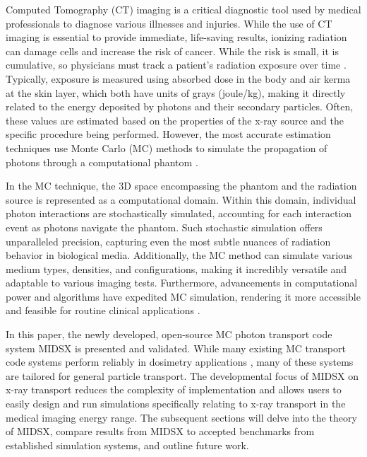 \par Computed Tomography (CT) imaging is a critical diagnostic tool used by medical professionals to diagnose various illnesses and injuries. While the use of CT imaging is essential to provide immediate, life-saving results, ionizing radiation can damage cells and increase the risk of cancer. While the risk is small, it is cumulative, so physicians must track a patient's radiation exposure over time \cite{lauer2009elements}. Typically, exposure is measured using absorbed dose in the body and air kerma at the skin layer, which both have units of grays (joule/kg), making it directly related to the energy deposited by photons and their secondary particles. Often, these values are estimated based on the properties of the x-ray source and the specific procedure being performed. However, the most accurate estimation techniques use Monte Carlo (MC) methods to simulate the propagation of photons through a computational phantom \cite{essmedphys2012}. 
\par In the MC technique, the 3D space encompassing the phantom and the radiation source is represented as a computational domain. Within this domain, individual photon interactions are stochastically simulated, accounting for each interaction event as photons navigate the phantom. Such stochastic simulation offers unparalleled precision, capturing even the most subtle nuances of radiation behavior in biological media. Additionally, the MC method can simulate various medium types, densities, and configurations, making it incredibly versatile and adaptable to various imaging tests. Furthermore, advancements in computational power and algorithms have expedited MC simulation, rendering it more accessible and feasible for routine clinical applications \cite{fernandez_bosman_validation_2021}.
\par In this paper, the newly developed, open-source MC photon transport code system MIDSX is presented and validated. While many existing MC transport code systems perform reliably in dosimetry applications \cite{fernandez_bosman_validation_2021, geant4valid2004}, many of these systems are tailored for general particle transport. The developmental focus of MIDSX on x-ray transport reduces the complexity of implementation and allows users to easily design and run simulations specifically relating to x-ray transport in the medical imaging energy range. The subsequent sections will delve into the theory of MIDSX, compare results from MIDSX to accepted benchmarks from established simulation systems, and outline future work.

